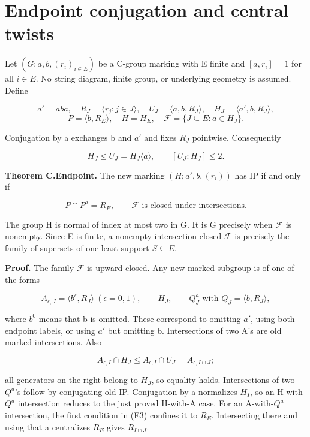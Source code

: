 \section{Endpoint conjugation and central
twists}\label{endpoint-conjugation-and-central-twists}

Let \((G;a,b,(r_i)_{i\in E})\) be a C-group marking with E finite and \([a,r_i]=1\)
for all \(i\in E\). No string diagram, finite group, or underlying
geometry is assumed. Define

\[
a'=aba,\quad R_J=\langle r_j:j\in J\rangle,\quad
U_J=\langle a,b,R_J\rangle,\quad H_J=\langle a',b,R_J\rangle,
\] \[
P=\langle b,R_E\rangle,\quad H=H_E,\quad
\mathcal F=\{J\subseteq E:a\in H_J\}.
\tag{E1}
\]

Conjugation by a exchanges b and \(a'\) and fixes \(R_J\) pointwise.
Consequently

\[
H_J\trianglelefteq U_J=H_J\langle a\rangle,
\qquad [U_J:H_J]\le2.
\tag{E2}
\]

\textbf{Theorem C.Endpoint.} The new marking \((H;a',b,(r_i))\) has IP
if and only if

\[
P\cap P^a=R_E,
\qquad \mathcal F\text{ is closed under intersections}.
\tag{E3}
\]

The group H is normal of index at most two in G. It is G precisely when
\(\mathcal F\) is nonempty. Since E is finite, a nonempty
intersection-closed \(\mathcal F\) is precisely the family of supersets
of one least support \(S\subseteq E\).

\textbf{Proof.} The family \(\mathcal F\) is upward closed. Any new
marked subgroup is of one of the forms

\[
A_{\epsilon,J}=\langle b^\epsilon,R_J\rangle\ (\epsilon=0,1),
\qquad H_J,\qquad Q_J^a\text{ with }Q_J=\langle b,R_J\rangle,
\tag{E4}
\]

where \(b^{0}\) means that b is omitted. These correspond to omitting
\(a'\), using both endpoint labels, or using \(a'\) but omitting b.
Intersections of two A's are old marked intersections. Also

\[
A_{\epsilon,I}\cap H_J
\le A_{\epsilon,I}\cap U_J=A_{\epsilon,I\cap J};
\]

all generators on the right belong to \(H_J\), so equality holds.
Intersections of two \(Q^a\)'s follow by conjugating old IP. Conjugation
by a normalizes \(H_I\), so an H-with-\(Q^a\) intersection reduces to
the just proved H-with-A case. For an A-with-\(Q^a\) intersection, the
first condition in (E3) confines it to \(R_E\). Intersecting there and
using that a centralizes \(R_E\) gives \(R_{I\cap J}\).

